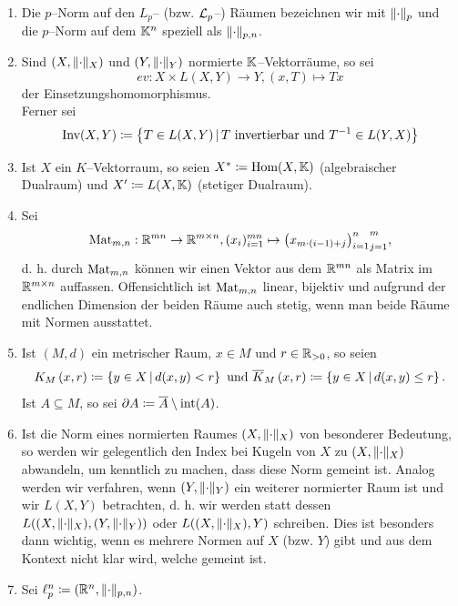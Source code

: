 \begin{enumerate}[(1)]
       Für $A\in K^{n\times m}$ definieren wir $A_i \coloneqq  A e_i^n$ und
       $A_{i,j}\coloneqq \sprod{A_i}{e_j^m}_m$ für alle $i\in\haken n$,
       $j\in\haken m$, d. h. $A_i$ ist die $i$--te Spalte von $A$ und $A_{i,j}$
       ist der $j$--te Eintrag in der $i$--ten Spalten von $A$.\\
       Ist analog $\Omega$ eine Menge und 
       $\alpha:\Omega \rightarrow K^{m\times n}$, so bezeichnen wir für alle 
       $i \in \haken n$ und alle $j \in \haken m$
       \[\alpha_i: \Omega \rightarrow K^n, \omega \mapsto \alpha(\omega)_i
       \quad \text{und} \quad
       \alpha_{i,j}:\Omega\rightarrow K,\omega\mapsto\alpha(\omega)_{i,j}
       \text.\]
 \item \label{Bez9}
       Die $p$--Norm auf den $L_p$-- (bzw. $\mathcal{L}_p$--) Räumen bezeichnen wir
       mit $\lVert\cdot\rVert_p$ und die $p$--Norm auf dem $\mathbb{K}^n$ speziell als 
       $\lVert\cdot\rVert_{p, n}$.
 \item \label{Bez10}
       Sind $(X, \lVert\cdot\rVert_X)$ und $(Y, \lVert\cdot\rVert_Y)$ normierte
       $\mathbb{K}$--Vektorräume, so sei
       \[ ev : X \times L(X, Y) \rightarrow Y, (x, T) \mapsto Tx \]
       der Einsetzungshomomorphismus.\\
       Ferner sei
       \[\mathop{\textrm{Inv}}\nolimits(X, Y) \coloneqq  \left\{T \in L(X, Y)\,|\,T \text{ invertierbar und }
       T^{-1} \in L(Y, X)\right\}\]
 \item \label{Bez11}
       Ist $X$ ein $K$--Vektorraum, so seien $X^* \coloneqq  \mathop{\textrm{Hom}}\nolimits(X,\mathbb{K})$ (algebraischer
       Dualraum) und $X'\coloneqq L(X, \mathbb{K})$ (stetiger Dualraum).
 \item \label{Bez12}
       Sei 
\[\mathop{\textrm{Mat}}\nolimits_{m,n}: \mathbb{R}^{mn} \rightarrow \mathbb{R}^{m \times n}, (x_i)_{i=1}^{mn} \mapsto
{\left(x_{m\cdot (i-1) + j}\right)_{i=1}^n}_{j=1}^m\text,\]
d. h. durch $\mathop{\textrm{Mat}}\nolimits_{m,n}$ können wir einen Vektor aus dem $\mathbb{R}^{mn}$ als Matrix
im $\mathbb{R}^{m \times n}$ auffassen. Offensichtlich ist $\mathop{\textrm{Mat}}\nolimits_{m,n}$ linear,
bijektiv und aufgrund der endlichen Dimension der beiden Räume auch stetig,
wenn man beide Räume mit Normen ausstattet.
 \item \label{Bez14} Ist $(M,d)$ ein metrischer Raum, $x \in M$ und $r \in
  \mathbb{R}_{>0}$, so seien
  \[K_{M}\left(x, r\right) \coloneqq  \left\{y \in X\,|\,d(x,y) < r\right\}\text{ und }
  \overline K_{M}\left(x, r\right) \coloneqq  \left\{y \in X\,|\,d(x,y) \le r\right\}\text.\]
  Ist $A \subseteq M$, so sei $\partial A \coloneqq  \overline A \setminus \mathop{\textrm{int}}\nolimits(A)$.
 \item \label{Bez15}
 Ist die Norm eines normierten Raumes $(X, \lVert\cdot\rVert_X)$ von besonderer
 Bedeutung, so werden wir gelegentlich den Index bei Kugeln von $X$ zu
 $(X, \lVert\cdot\rVert_X)$ abwandeln, um kenntlich zu machen, dass diese Norm
 gemeint ist. Analog werden wir verfahren, wenn $(Y, \lVert\cdot\rVert_Y)$ ein
 weiterer normierter Raum ist und wir $L(X,Y)$ betrachten, d. h. wir werden
 statt dessen $L((X, \lVert\cdot\rVert_X), (Y, \lVert\cdot\rVert_Y))$ oder
 $L((X, \lVert\cdot\rVert_X),Y)$ schreiben. Dies ist besonders dann wichtig, wenn es
 mehrere Normen auf $X$ (bzw. $Y$) gibt und aus dem Kontext nicht klar wird,
 welche gemeint ist.
 \item \label{Bez16}
 Sei $\ell_p^n \coloneqq  (\mathbb{R}^n, \lVert\cdot\rVert_{p,n})$.
\end{enumerate}